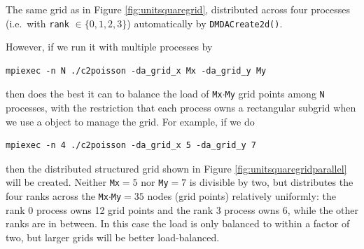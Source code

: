 \begin{marginfigure}
\caption{The same grid as in Figure \ref{fig:unitsquaregrid}, distributed across four \MPI processes (i.e.~with \texttt{rank} $\in \{0,1,2,3\}$) automatically by \texttt{DMDACreate2d()}.}
\label{fig:unitsquaregridparallel}
\end{marginfigure}

However, if we run it with multiple \MPI processes by
\begin{Verbatim}[fontsize=\small]
  mpiexec -n N ./c2poisson -da_grid_x Mx -da_grid_y My
\end{Verbatim}
then \PETSc does the best it can to balance the load of \texttt{Mx}$\cdot$\texttt{My} grid points among \texttt{N} processes, with the restriction that each \MPI process owns a rectangular subgrid when we use a \pDMDA object to manage the grid.  For example, if we do
\begin{Verbatim}[fontsize=\small]
  mpiexec -n 4 ./c2poisson -da_grid_x 5 -da_grid_y 7
\end{Verbatim}
then the distributed structured grid shown in Figure \ref{fig:unitsquaregridparallel} will be created.  Neither \texttt{Mx}$=5$ nor \texttt{My}$=7$ is divisible by two, but \PETSc distributes the four ranks across the \texttt{Mx}$\cdot$\texttt{My}$=35$ nodes (grid points) relatively uniformly: the rank $0$ process owns 12 grid points and the rank $3$ process owns 6, while the other ranks are in between.  In this case the load is only balanced to within a factor of two, but larger grids will be better load-balanced.  

